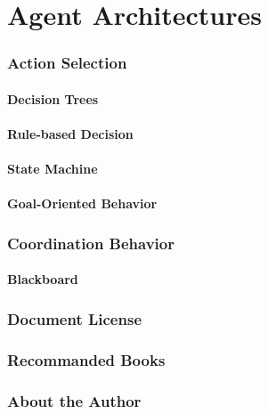 \part{Agent Architectures}
	\section{Action Selection}
	\subsection{Decision Trees}
	
	\subsection{Rule-based Decision}
	
	\subsection{State Machine}
	
	\subsection{Goal-Oriented Behavior}
	

	\section{Coordination Behavior}
	\subsection{Blackboard}
	

\appendix
\section{Document License}

\section{Recommanded Books}

\section{About the Author}


\endinput
